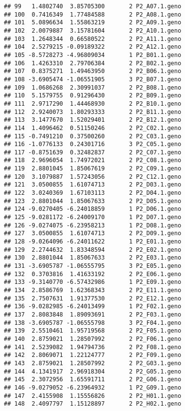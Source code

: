 \documentclass[]{article}
\begin{document}
\begin{verbatim}
## 99   1.4802740  3.85705300       2 P2_A07.1.geno
## 100  0.7416349  1.77484588       2 P2_A08.1.geno
## 101  5.0896634  1.55863219       2 P2_A09.1.geno
## 102  2.0079887  3.15781604       2 P2_A10.1.geno
## 103  1.2648344  0.66580522       2 P2_A11.1.geno
## 104  2.5279215 -0.09189322       2 P2_A12.1.geno
## 105 -8.5728273 -4.96809034       1 P2_B01.1.geno
## 106  1.4263310  2.79706384       2 P2_B02.1.geno
## 107  0.8375271  1.49463950       2 P2_B06.1.geno
## 108 -3.6905474 -1.06551905       3 P2_B07.1.geno
## 109  1.0686268  2.30991037       2 P2_B08.1.geno
## 110  5.1579755  0.91296430       2 P2_B09.1.geno
## 111  2.9717290  1.44468930       2 P2_B10.1.geno
## 112  2.9240073  1.80293333       2 P2_B11.1.geno
## 113  3.1477670  1.52029401       2 P2_B12.1.geno
## 114  1.4096462  0.51150246       2 P2_C02.1.geno
## 115 -0.7491210  0.37500260       2 P2_C03.1.geno
## 116 -1.0776133  0.24301716       3 P2_C05.1.geno
## 117 -0.8751639  0.32482837       2 P2_C07.1.geno
## 118  2.9696054  1.74972021       2 P2_C08.1.geno
## 119  2.8801045  1.85067619       2 P2_C09.1.geno
## 120  3.1079887  1.57243056       2 P2_C12.1.geno
## 121  3.0500855  1.61074713       2 P2_D03.1.geno
## 122  3.0240369  1.67103113       2 P2_D04.1.geno
## 123  2.8801044  1.85067633       2 P2_D05.1.geno
## 124 -9.0270405 -6.24018859       1 P2_D06.1.geno
## 125 -9.0281172 -6.24009170       1 P2_D07.1.geno
## 126 -9.0274075 -6.23958213       1 P2_D08.1.geno
## 127  3.0500855  1.61074713       2 P2_D09.1.geno
## 128 -9.0264096 -6.24011622       1 P2_E01.1.geno
## 129  2.2744632  1.83348594       2 P2_E02.1.geno
## 130  2.8801044  1.85067633       2 P2_E03.1.geno
## 131 -3.6905787 -1.06555795       3 P2_E05.1.geno
## 132  0.3703816  1.41633192       2 P2_E06.1.geno
## 133 -9.3140770 -6.57432986       1 P2_E09.1.geno
## 134  2.8586769  1.62368343       2 P2_E11.1.geno
## 135  2.7507631  1.91377530       2 P2_E12.1.geno
## 136 -9.0282985 -6.24013499       1 P2_F02.1.geno
## 137  2.8083848  1.89093691       2 P2_F03.1.geno
## 138 -3.6905787 -1.06555798       3 P2_F04.1.geno
## 139  2.5510461  1.95719568       2 P2_F05.1.geno
## 140  2.8759021  1.28507992       2 P2_F06.1.geno
## 141  2.5239082  1.94794736       2 P2_F08.1.geno
## 142  2.8069071  1.22124777       2 P2_F09.1.geno
## 143  2.8759021  1.28507992       2 P2_G03.1.geno
## 144  4.1341917  2.96918304       2 P2_G05.1.geno
## 145  2.3072956  1.65591711       2 P2_G06.1.geno
## 146 -9.0279052 -6.23964932       1 P2_G09.1.geno
## 147  2.4155908  1.15556826       2 P2_H01.1.geno
## 148  2.4097797  1.15128897       2 P2_H02.1.geno

\end{verbatim}
\end{document}
